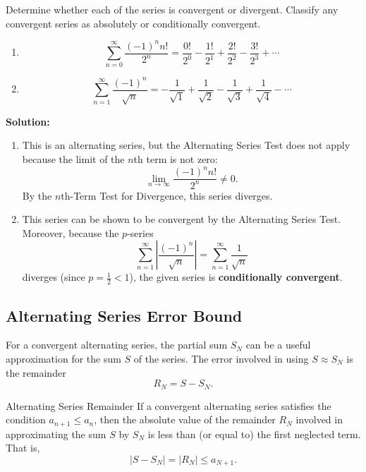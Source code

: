 \documentclass[12pt]{article}
\theoremstyle{beautifulthm}
\begin{document}
\begin{tcolorbox}[colback=examplebg, colframe=red!75!black, title=\textbf{EXAMPLE 2: bsolute or Conditional Convergence}, fonttitle=\bfseries, sharp corners]
Determine whether each of the series is convergent or divergent. Classify any convergent series as absolutely or conditionally convergent.
\begin{enumerate}
    \item[(a)] \[
    \sum_{n=0}^\infty \frac{(-1)^n n!}{2^n} = \frac{0!}{2^0} - \frac{1!}{2^1} + \frac{2!}{2^2} - \frac{3!}{2^3} + \cdots
    \]
    \item[(b)] \[
    \sum_{n=1}^\infty \frac{(-1)^n}{\sqrt{n}} = -\frac{1}{\sqrt{1}} + \frac{1}{\sqrt{2}} - \frac{1}{\sqrt{3}} + \frac{1}{\sqrt{4}} - \cdots
    \]
\end{enumerate}


\tcblower
\textbf{Solution:} 
\begin{enumerate}
    \item[(a)] This is an alternating series, but the Alternating Series Test does not apply because the limit of the $n$th term is not zero:
    \[
    \lim_{n \to \infty} \frac{(-1)^n n!}{2^n} \neq 0.
    \]
    By the $n$th-Term Test for Divergence, this series diverges.

    \item[(b)] This series can be shown to be convergent by the Alternating Series Test. Moreover, because the $p$-series
    \[
    \sum_{n=1}^\infty \left| \frac{(-1)^n}{\sqrt{n}} \right| = \sum_{n=1}^\infty \frac{1}{\sqrt{n}}
    \]
    diverges (since $p = \frac{1}{2} < 1$), the given series is \textbf{conditionally convergent}.
\end{enumerate}
\end{tcolorbox}

\newpage

\subsection{Alternating Series
Error Bound}

For a convergent alternating series, the partial sum $S_N$ can be a useful approximation for the sum $S$ of the series. The error involved in using $S \approx S_N$ is the remainder
\[
R_N = S - S_N.
\]
\begin{mytheorem}{Alternating Series Remainder}{}
    If a convergent alternating series satisfies the condition $a_{n+1} \leq a_n$, then the absolute value of the remainder $R_N$ involved in approximating the sum $S$ by $S_N$ is less than (or equal to) the first neglected term. That is,
\[
|S - S_N| = |R_N| \leq a_{N+1}.
\]

\end{mytheorem}
\end{document}
